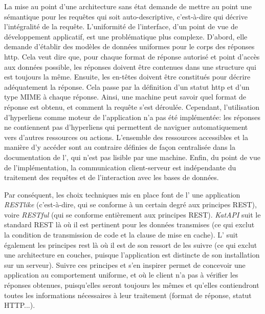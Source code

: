 La mise au point d'une architecture sans état demande de mettre au point une sémantique pour les requêtes qui soit auto-descriptive, c'est-à-dire qui décrive l'intégralité de la requête. L'uniformité de l'interface, d'un point de vue de développement applicatif, est une problématique plus complexe. D'abord, elle demande d'établir des modèles de données uniformes pour le corps des réponses \gls{http}. Cela veut dire que, pour chaque format de réponse autorisé et point d'accès aux données possible, les réponses doivent être contenues dans une structure qui est toujours la même. Ensuite, les en-têtes doivent être constitués pour décrire adéquatement la réponse. Cela passe par la définition d'un statut \gls{http} et d'un type MIME à chaque réponse. Ainsi, une machine peut savoir quel format de réponse est obtenu, et comment la requête s'est déroulée. Cependant, l'utilisation d'hyperliens comme moteur de l'application n'a pas été implémentée: les réponses ne contiennent pas d'hyperliens qui permettent de naviguer automatiquement vers d'autres ressources ou actions. L'ensemble des ressources accessibles et la manière d'y accéder sont au contraire définies de façon centralisée dans la documentation de l'\api{}, qui n'est pas lisible par une machine. Enfin, du point de vue de l'implémentation, la communication client-serveur est indépendante du traitement des requêtes et de l'interaction avec les bases de données.

Par conséquent, les choix techniques mis en place font de l'\api{} une application \textit{RESTlike} (c'est-à-dire, qui se conforme à un certain degré aux principes REST), voire \textit{RESTful} (qui se conforme entièrement aux principes REST). \textit{KatAPI} suit le standard REST là où il est pertinent pour les données transmises (ce qui exclut la condition de transmission de code et la clause de mise en cache). L'\api{} suit également les principes \gls{rest} là où il est de son ressort de les suivre (ce qui exclut une architecture en couches, puisque l'application est distincte de son installation sur un serveur). Suivre ces principes et s'en inspirer permet de concevoir une application au comportement uniforme, et où le client n'a pas à vérifier les réponses obtenues, puisqu'elles seront toujours les mêmes et qu'elles contiendront toutes les informations nécessaires à leur traitement (format de réponse, statut HTTP...).


